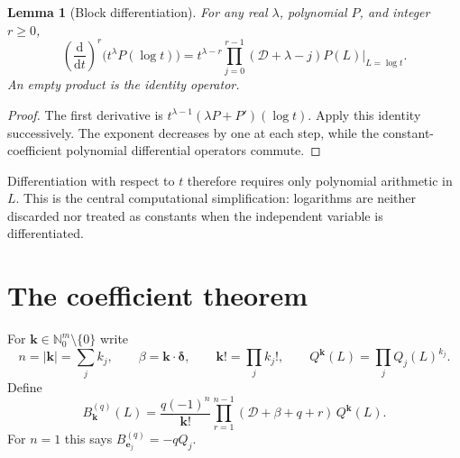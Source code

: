 \documentclass[11pt,a4paper]{article}
\numberwithin{equation}{section}
\newtheorem{lemma}[theorem]{Lemma}
\theoremstyle{definition}
\newcommand{\N}{\mathbb N}
\newcommand{\dd}{\mathrm d}
\newcommand{\D}{\mathcal D}
\newcommand{\kk}{\boldsymbol k}
\newcommand{\deltaa}{\boldsymbol\delta}
\begin{document}
\begin{lemma}[Block differentiation]\label{lem:block}
For any real $\lambda$, polynomial $P$, and integer $r\ge0$,
\begin{equation}\label{eq:block}
 \left(\frac{\dd}{\dd t}\right)^r
       \bigl(t^\lambda P(\log t)\bigr)
 =t^{\lambda-r}
       \prod_{j=0}^{r-1}(\D+\lambda-j)P(L)\bigg|_{L=\log t}.
\end{equation}
An empty product is the identity operator.
\end{lemma}
\begin{proof}
The first derivative is
$t^{\lambda-1}(\lambda P+P')(\log t)$.
Apply this identity successively. The exponent decreases by one at each
step, while the constant-coefficient polynomial differential operators
commute.
\end{proof}

Differentiation with respect to $t$ therefore requires only polynomial
arithmetic in $L$. This is the central computational simplification:
logarithms are neither discarded nor treated as constants when the
independent variable is differentiated.

\section{The coefficient theorem}\label{sec:coefficients}

For $\kk\in\N_0^m\setminus\{0\}$ write
\begin{equation}\label{eq:multi-notation}
 n=|\kk|=\sum_jk_j,\qquad
 \beta=\kk\cdot\deltaa,\qquad
 \kk!=\prod_jk_j!,\qquad
 Q^{\kk}(L)=\prod_jQ_j(L)^{k_j}.
\end{equation}
Define
\begin{equation}\label{eq:main-coefficient}
 \boxed{\displaystyle
 B_{\kk}^{(q)}(L)=
 \frac{q(-1)^n}{\kk!}
 \prod_{r=1}^{n-1}(\D+\beta+q+r)\,Q^{\kk}(L).}
\end{equation}
For $n=1$ this says $B_{\boldsymbol e_j}^{(q)}=-qQ_j$.
\end{document}
